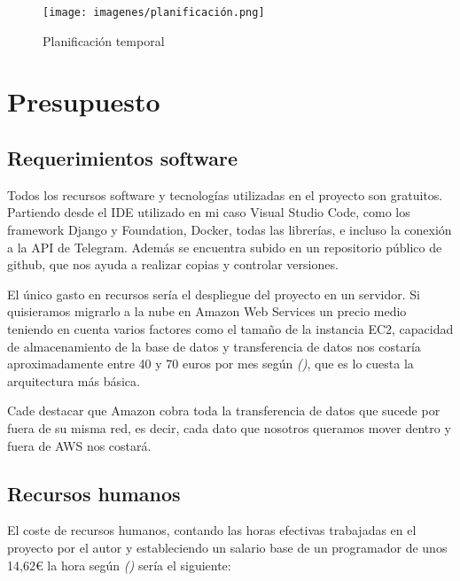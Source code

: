 \begin{figure}[!ht]
    \centering
    \texttt{[image: imagenes/planificación.png]}
    \caption{ Planificación temporal }
    \label{fig:planificacion}
\end{figure}
\vspace{1cm}

\section{Presupuesto}

\subsection{Requerimientos software}

Todos los recursos software y tecnologías utilizadas en el proyecto son gratuitos. Partiendo desde el IDE utilizado en mi caso Visual Studio Code, como los framework Django y Foundation, Docker, todas las librerías, e incluso la conexión a la API de Telegram. Además se encuentra subido en un repositorio público de github, que nos ayuda a realizar copias y controlar versiones. 

El único gasto en recursos sería el despliegue del proyecto en un servidor. Si quisieramos migrarlo a la nube en Amazon Web Services un precio medio teniendo en cuenta varios factores como el tamaño de la instancia EC2, capacidad de almacenamiento de la base de datos y transferencia de datos nos costaría aproximadamente entre 40 y 70 euros por mes según \textit{(\cite{aws2022})}, que es lo cuesta la arquitectura más básica. 

Cade destacar que Amazon cobra toda la transferencia de datos que sucede por fuera de su misma red, es decir, cada dato que nosotros queramos mover dentro y fuera de AWS nos costará.


\subsection{Recursos humanos}


El coste de recursos humanos, contando las horas efectivas trabajadas en el proyecto por el autor y estableciendo un salario base de un programador de unos 14,62€ la hora según  \textit{(\cite{salario2022})} sería el siguiente:\vspace{0.5cm}


